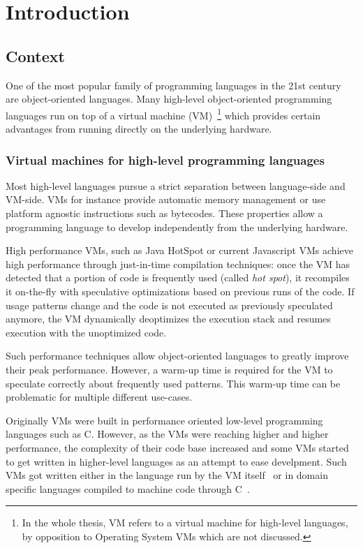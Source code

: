 \documentclass[a4paper,12pt,twoside]{../includes/ThesisStyle}
\begin{document}
\fi

\chapter{Introduction}
\label{chap:intro}
\minitoc

\section{Context}

One of the most popular family of programming languages in the 21st century are object-oriented languages. Many high-level object-oriented programming languages run on top of a virtual machine (VM)~\footnote{In the whole thesis, VM refers to a virtual machine for high-level languages, by opposition to Operating System VMs which are not discussed.} which provides certain advantages from running directly on the underlying hardware. 

\subsection{Virtual machines for high-level programming languages}

Most high-level languages pursue a strict separation between language-side and VM-side. VMs for instance provide automatic memory management or use platform agnostic instructions such as bytecodes. These properties allow a programming language to develop independently from the underlying hardware.

High performance VMs, such as Java HotSpot or current Javascript VMs achieve high performance through just-in-time compilation techniques: once the VM has detected that a portion of code is frequently used (called \emph{hot spot}), it recompiles it on-the-fly with speculative optimizations based on previous runs of the code. If usage patterns change and the code is not executed as previously speculated anymore, the VM dynamically deoptimizes the execution stack and resumes execution with the unoptimized code.

Such performance techniques allow object-oriented languages to greatly improve their peak performance. However, a warm-up time is required for the VM to speculate correctly about frequently used patterns. This warm-up time can be problematic for multiple different use-cases.

Originally VMs were built in performance oriented low-level programming languages such as C. However, as the VMs were reaching higher and higher performance, the complexity of their code base increased and some VMs started to get written in higher-level languages as an attempt to ease develpment. Such VMs got written either in the language run by the VM itself~\cite{Unga05b,Wimm13a,Alp99a} or in domain specific languages compiled to machine code through C~\cite{Rigo06a,Inga97a}.
\end{document}
